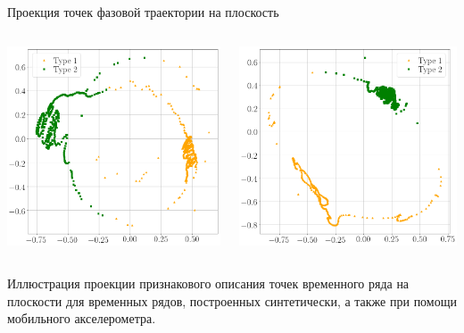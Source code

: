 \documentclass[10pt,pdf,hyperref={unicode}]{beamer}
\begin{document}
\begin{frame}[shrink=5]{Проекция точек фазовой траектории на плоскость}
\begin{columns}
    \begin{column}{0.35\textwidth}
        \includegraphics[width=1\textwidth]{results/real_1_2D_vector}
    \end{column}
    \begin{column}{0.35\textwidth}
        \includegraphics[width=1\textwidth]{results/real_2_2D_vector}
    \end{column}
\end{columns}

Иллюстрация проекции признакового описания точек временного ряда на плоскости для временных рядов, построенных синтетически, а также при помощи мобильного акселерометра.

\end{frame}
\end{document}
